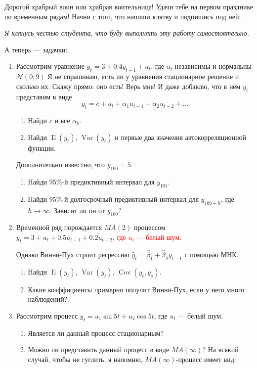\documentclass[12pt]{article}
\DeclareMathOperator{\Cov}{Cov}
\DeclareMathOperator{\Var}{Var}
\DeclareMathOperator{\E}{E}
\def \cN{\mathcal{N}}
\begin{document}
Дорогой храбрый воин или храбрая воительница! Удачи тебе на первом празднике по временным рядам!
Начни с того, что напиши клятву и подпишись под ней:

\vspace{10pt}
\textit{Я клянусь честью студента, что буду выполнять эту работу самостоятельно.}
\vspace{10pt}


А теперь — задачки:


\begin{enumerate}

\item Рассмотрим уравнение $y_t = 3 + 0.4y_{t-1} + u_t$, где $u_t$ независимы и нормальны $\cN(0; 9)$
Я не спрашиваю, есть ли у уравнения стационарное решение и сколько их.  
Скажу прямо: оно есть! Верь мне! И даже добавлю, что в нём $y_t$ представим в виде 
\[
	y_t = c + u_t + \alpha_1 u_{t-1} + \alpha_2 u_{t-2} + \ldots
\]

\begin{enumerate}
	\item Найди $c$ и все $\alpha_k$.
	\item Найди $\E(y_t)$, $\Var(y_t)$ и первые два значения автокорреляционной функции. 
\end{enumerate}
Дополнительно известно, что $y_{100}=5$.
\begin{enumerate}[resume]
	\item Найди 95\%-й предиктивный интервал для $y_{101}$. 
	\item Найди 95\%-й долгосрочный предиктивный интервал для $y_{100+h}$, 
	где $h \to \infty$. Зависит ли он от $y_{100}$?
\end{enumerate}
	


\item Временной ряд порождается $MA(2)$ процессом $y_t = 3 + u_t + 0.5u_{t-1} + 0.2 u_{t-2}$, 
\textcolor{red}{где $u_t$ — белый шум}.

Однако Винни-Пух строит регрессию $\hat y_t = \hat\beta_1 + \hat\beta_2 y_{t-1}$ с помощью МНК.

\begin{enumerate}
	\item Найди $\E(y_t)$, $\Var(y_t)$, $\Cov(y_t, y_s)$.
	\item Какие коэффициенты примерно получит Винни-Пух, если у него много наблюдений?
\end{enumerate}


\item Рассмотрим процесс $y_t = u_1 \sin 5t + u_2 \cos 5t$, где $u_t$ — белый шум.
\begin{enumerate}
	\item Является ли данный процесс стационарным?
	\item Можно ли представить данный процесс в виде $MA(\infty)$? 
	На всякий случай, чтобы не гуглить, я напомню, $MA(\infty)$-процесс имеет вид:


\end{enumerate}
\end{enumerate}
\end{document}
